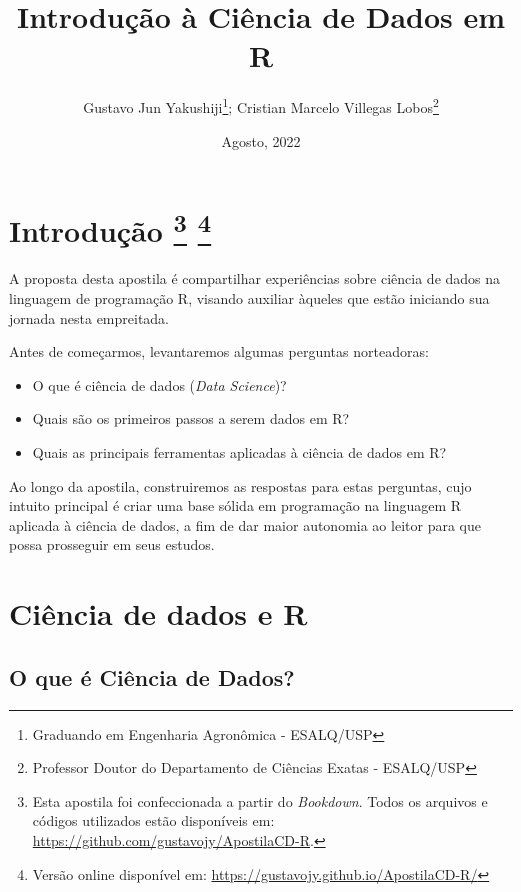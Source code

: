 \documentclass[
  brazilian,
]{book}
\title{Introdução à Ciência de Dados em R}
\author{Gustavo Jun Yakushiji\footnote{Graduando em Engenharia Agronômica - ESALQ/USP}; Cristian Marcelo Villegas Lobos\footnote{Professor Doutor do Departamento de Ciências Exatas - ESALQ/USP}}
\date{Agosto, 2022}
\begin{document}
\maketitle

{
\hypersetup{linkcolor=}
\setcounter{tocdepth}{1}
\tableofcontents
}
\hypertarget{introduuxe7uxe3o}{%
\chapter[Introdução ]{\texorpdfstring{Introdução \footnote{Esta apostila foi confeccionada a partir do \emph{Bookdown}. Todos os arquivos e códigos utilizados estão disponíveis em: \url{https://github.com/gustavojy/ApostilaCD-R}.} \footnote{Versão online disponível em: \url{https://gustavojy.github.io/ApostilaCD-R/}}}{Introdução  }}\label{introduuxe7uxe3o}}

A proposta desta apostila é compartilhar experiências sobre ciência de dados na linguagem de programação R, visando auxiliar àqueles que estão iniciando sua jornada nesta empreitada.

Antes de começarmos, levantaremos algumas perguntas norteadoras:

\begin{itemize}
\item
  O que é ciência de dados (\emph{Data Science})?
\item
  Quais são os primeiros passos a serem dados em R?
\item
  Quais as principais ferramentas aplicadas à ciência de dados em R?
\end{itemize}

Ao longo da apostila, construiremos as respostas para estas perguntas, cujo intuito principal é criar uma base sólida em programação na linguagem R aplicada à ciência de dados, a fim de dar maior autonomia ao leitor para que possa prosseguir em seus estudos.

\hypertarget{ciuxeancia-de-dados-e-r}{%
\chapter{Ciência de dados e R}\label{ciuxeancia-de-dados-e-r}}

\hypertarget{o-que-uxe9-ciuxeancia-de-dados}{%
\section{O que é Ciência de Dados?}\label{o-que-uxe9-ciuxeancia-de-dados}}
\end{document}
